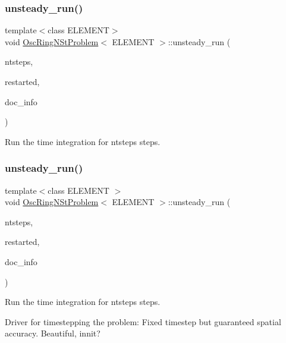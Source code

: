 \subsubsection{\texorpdfstring{unsteady\+\_\+run()}{unsteady\_run()}\hspace{0.1cm}{\footnotesize\ttfamily [1/2]}}
{\footnotesize\ttfamily template$<$class E\+L\+E\+M\+E\+NT$>$ \\
void \hyperlink{classOscRingNStProblem}{Osc\+Ring\+N\+St\+Problem}$<$ E\+L\+E\+M\+E\+NT $>$\+::unsteady\+\_\+run (\begin{DoxyParamCaption}\item[{const unsigned \&}]{ntsteps,  }\item[{const bool \&}]{restarted,  }\item[{Doc\+Info \&}]{doc\+\_\+info }\end{DoxyParamCaption})}



Run the time integration for ntsteps steps. 

\mbox{\label{classOscRingNStProblem_a00e957fb6a313a9c1de784d0fa3a7a36}} 
\subsubsection{\texorpdfstring{unsteady\+\_\+run()}{unsteady\_run()}\hspace{0.1cm}{\footnotesize\ttfamily [2/2]}}
{\footnotesize\ttfamily template$<$class E\+L\+E\+M\+E\+NT $>$ \\
void \hyperlink{classOscRingNStProblem}{Osc\+Ring\+N\+St\+Problem}$<$ E\+L\+E\+M\+E\+NT $>$\+::unsteady\+\_\+run (\begin{DoxyParamCaption}\item[{const unsigned \&}]{ntsteps,  }\item[{const bool \&}]{restarted,  }\item[{Doc\+Info \&}]{doc\+\_\+info }\end{DoxyParamCaption})}



Run the time integration for ntsteps steps. 

Driver for timestepping the problem\+: Fixed timestep but guaranteed spatial accuracy. Beautiful, innit? 

